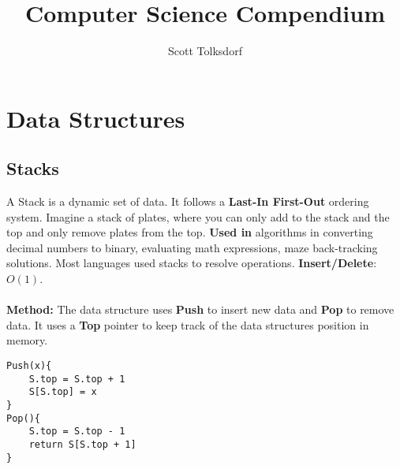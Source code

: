 \documentclass{article}
\begin{document}
\reversemarginpar
{}

\title{Computer Science Compendium}
\author{Scott Tolksdorf}
\maketitle
\clearpage
\setcounter{tocdepth}{2}
\tableofcontents



\clearpage
\section{Data Structures}


\subsection{Stacks}
A Stack is a dynamic set of data. It follows a {\bf Last-In First-Out} ordering system. Imagine a stack of plates, where you can only add to the stack and the top and only remove plates from the top. {\bf Used in} algorithms in converting decimal numbers to binary, evaluating math expressions, maze back-tracking solutions. Most languages used stacks to resolve operations. {\bf Insert/Delete}: $O(1)$.
\\ \\
{\bf Method:} The data structure uses {\bf Push} to insert new data and {\bf Pop} to remove data. It uses a {\bf Top} pointer to keep track of the data structures position in memory.

\begin{lstlisting}[style=pseudo]
Push(x){
	S.top = S.top + 1
	S[S.top] = x
}
Pop(){
	S.top = S.top - 1
	return S[S.top + 1]
}
\end{lstlisting}
\end{document}
